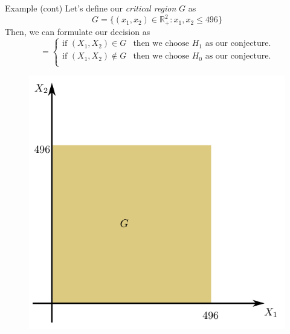 \documentclass{beamer}
\begin{document}
\begin{frame}{Example (cont)}
	Let's define our \textit{critical region} $G$ as 
	\begin{equation*}
		G=\{(x_1,x_2)\in \mathbb{R}^2_+: x_1,x_2 \le 496\}
	\end{equation*}
	Then, we can formulate our decision as
	\begin{equation*}
		=
		\begin{cases}
			\text{if }(X_1,X_2) \in G & \text{then we choose $H_1$ as our conjecture}.\\
			\text{if }(X_1,X_2) \notin G & \text{then we choose $H_0$ as our conjecture}.\\
		\end{cases}	
		\end{equation*}
	\begin{figure}[h]
	\centering
	\includegraphics[scale=0.35]{../../Figures/fig_hypo_test_region.png}
\end{figure}		
	
	
\end{frame}
\end{document}
